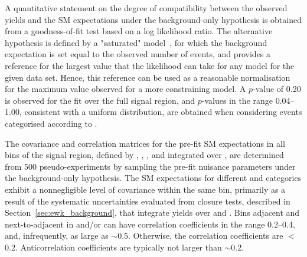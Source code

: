 A quantitative statement on the degree of compatibility between the
observed yields and the SM expectations under the background-only
hypothesis is obtained from a goodness-of-fit test based on a log
likelihood ratio. The alternative hypothesis is defined by a
"saturated" model~\cite{sat-llk}, for which the background expectation
is set equal to the observed number of events, and provides a
reference for the largest value that the likelihood can take for any
model for the given data set. Hence, this reference can be used as a
reasonable normalisation for the maximum value observed for a more
constraining model. A $p$-value of 0.20 is observed for the fit over
the full signal region, and $p$-values in the range 0.04--1.00,
consistent with a uniform distribution, are obtained when considering
events categorised according to \njet.

The covariance and correlation matrices for the pre-fit SM
expectations in all bins of the signal region, defined by \njet, \nb,
\scalht, and integrated over \HTmiss, are determined from 500
pseudo-experiments by sampling the pre-fit nuisance parameters under
the background-only hypothesis. The SM expectations for different
\njet and \nb categories exhibit a nonnegligible level of covariance
within the same \scalht bin, primarily as a result of the systematic
uncertainties evaluated from closure tests, described in
Section~\ref{sec:ewk_background}, that integrate yields over \njet and
\nb. Bins adjacent and next-to-adjacent in \njet and/or \nb can have
correlation coefficients in the range 0.2--0.4, and, infrequently, as
large as $\sim$0.5. Otherwise, the correlation coefficients are
$<$0.2. Anticorrelation coefficients are typically not larger than
$\sim$0.2.

